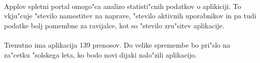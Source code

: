 \paragraph{}Applov spletni portal omogo"ca analizo statisti"cnih podatkov o aplikiciji. To vkju"cuje "stevilo namestitev na naprave, "stevilo aktivnih uporabnikov in pa tudi podatke bolj pomembne za ravijalce, kot so "stevilo zru"sitev aplikacije.
 
 \paragraph{}Trenutno ima aplikacija 139 prenosov. Do velike spremembe bo pri"slo na za"cetku "solskega leta, ko bodo novi dijaki nalo"zili aplikacijo.